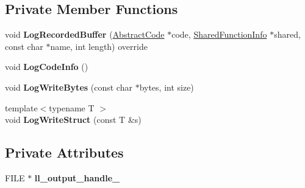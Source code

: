 \subsection*{Private Member Functions}
\begin{DoxyCompactItemize}
\item 
void {\bfseries Log\+Recorded\+Buffer} (\hyperlink{classv8_1_1internal_1_1_abstract_code}{Abstract\+Code} $\ast$code, \hyperlink{classv8_1_1internal_1_1_shared_function_info}{Shared\+Function\+Info} $\ast$shared, const char $\ast$name, int length) override\hypertarget{classv8_1_1internal_1_1_low_level_logger_a5c186b784475ff0654dbd18ff0919f48}{}\label{classv8_1_1internal_1_1_low_level_logger_a5c186b784475ff0654dbd18ff0919f48}

\item 
void {\bfseries Log\+Code\+Info} ()\hypertarget{classv8_1_1internal_1_1_low_level_logger_a41f344dd5216a19b69747ccc56eaf0be}{}\label{classv8_1_1internal_1_1_low_level_logger_a41f344dd5216a19b69747ccc56eaf0be}

\item 
void {\bfseries Log\+Write\+Bytes} (const char $\ast$bytes, int size)\hypertarget{classv8_1_1internal_1_1_low_level_logger_af55ef638dc4b6c862cf9d6741fc37706}{}\label{classv8_1_1internal_1_1_low_level_logger_af55ef638dc4b6c862cf9d6741fc37706}

\item 
{\footnotesize template$<$typename T $>$ }\\void {\bfseries Log\+Write\+Struct} (const T \&s)\hypertarget{classv8_1_1internal_1_1_low_level_logger_ad00a7cadc95b56f339e765b418d242aa}{}\label{classv8_1_1internal_1_1_low_level_logger_ad00a7cadc95b56f339e765b418d242aa}

\end{DoxyCompactItemize}
\subsection*{Private Attributes}
\begin{DoxyCompactItemize}
\item 
F\+I\+LE $\ast$ {\bfseries ll\+\_\+output\+\_\+handle\+\_\+}\hypertarget{classv8_1_1internal_1_1_low_level_logger_af811e6ca5c37ced6e03439b5eb997e7e}{}\label{classv8_1_1internal_1_1_low_level_logger_af811e6ca5c37ced6e03439b5eb997e7e}

\end{DoxyCompactItemize}
